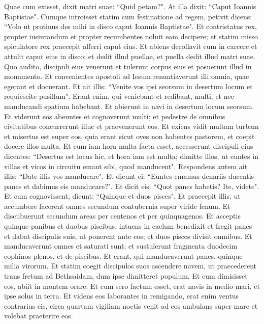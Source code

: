 \begin{biblechapter}
\verse Quae cum exisset, dixit matri suae: “Quid petam?". At illa dixit: “Caput Ioannis Baptistae". 
\verse Cumque introisset statim cum festinatione ad regem, petivit dicens: “Volo ut protinus des mihi in disco caput Ioannis Baptistae". 
\verse Et contristatus rex, propter iusiurandum et propter recumbentes noluit eam decipere; 
\verse et statim misso spiculatore rex praecepit afferri caput eius. Et abiens decollavit eum in carcere 
\verse et attulit caput eius in disco; et dedit illud puellae, et puella dedit illud matri suae. 
\verse Quo audito, discipuli eius venerunt et tulerunt corpus eius et posuerunt illud in monumento. 
\verse Et convenientes apostoli ad Iesum renuntiaverunt illi omnia, quae egerant et docuerant. 
\verse Et ait illis: “Venite vos ipsi seorsum in desertum locum et requiescite pusillum". Erant enim, qui veniebant et redibant, multi, et nec manducandi spatium habebant. 
\verse Et abierunt in navi in desertum locum seorsum. 
\verse Et viderunt eos abeuntes et cognoverunt multi; et pedestre de omnibus civitatibus concurrerunt illuc et praevenerunt eos. 
\verse Et exiens vidit multam turbam et misertus est super eos, quia erant sicut oves non habentes pastorem, et coepit docere illos multa. 
\verse Et cum iam hora multa facta esset, accesserunt discipuli eius dicentes: “Desertus est locus hic, et hora iam est multa; 
\verse dimitte illos, ut euntes in villas et vicos in circuitu emant sibi, quod manducent". 
\verse Respondens autem ait illis: “Date illis vos manducare". Et dicunt ei: “Euntes emamus denariis ducentis panes et dabimus eis manducare?". 
\verse Et dicit eis: “Quot panes habetis? Ite, videte". Et cum cognovissent, dicunt: “Quinque et duos pisces". 
\verse Et praecepit illis, ut accumbere facerent omnes secundum contubernia super viride fenum.  
\verse Et discubuerunt secundum areas per centenos et per quinquagenos. 
\verse Et acceptis quinque panibus et duobus piscibus, intuens in caelum benedixit et fregit panes et dabat discipulis suis, ut ponerent ante eos; et duos pisces divisit omnibus. 
\verse Et manducaverunt omnes et saturati sunt; 
\verse et sustulerunt fragmenta duodecim cophinos plenos, et de piscibus. 
\verse Et erant, qui manducaverunt panes, quinque milia virorum. 
\verse Et statim coegit discipulos suos ascendere navem, ut praecederent trans fretum ad Bethsaidam, dum ipse dimitteret populum. 
\verse Et cum dimisisset eos, abiit in montem orare. 
\verse Et cum sero factum esset, erat navis in medio mari, et ipse solus in terra. 
\verse Et videns eos laborantes in remigando, erat enim ventus contrarius eis, circa quartam vigiliam noctis venit ad eos ambulans super mare et volebat praeterire eos. 

\end{biblechapter}
